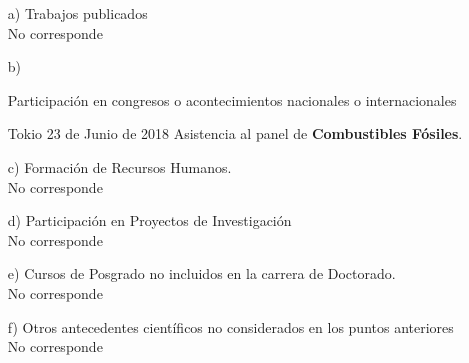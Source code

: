 \begin{enumerate}[leftmargin=0.8cm]
  \item[a)]{Trabajos publicados
    \\ No corresponde
  }

  \item[b)]{Participación en congresos o acontecimientos nacionales o internacionales

    \begin{itemize}[leftmargin=0.2cm]

      {Tokio}
      {23 de Junio de 2018}
      {Asistencia al panel de \textbf{Combustibles Fósiles}.}

    \end{itemize}
  }

  \item[c)]{Formación de Recursos Humanos.
    \\ No corresponde
  }

  \item[d)]{Participación en Proyectos de Investigación
    \\ No corresponde
  }

  \item[e)]{Cursos de Posgrado no incluidos en la carrera de Doctorado.
    \\ No corresponde
  }

  \item[f)]{Otros antecedentes científicos no considerados en los puntos anteriores
    \\ No corresponde
  }

\end{enumerate}
